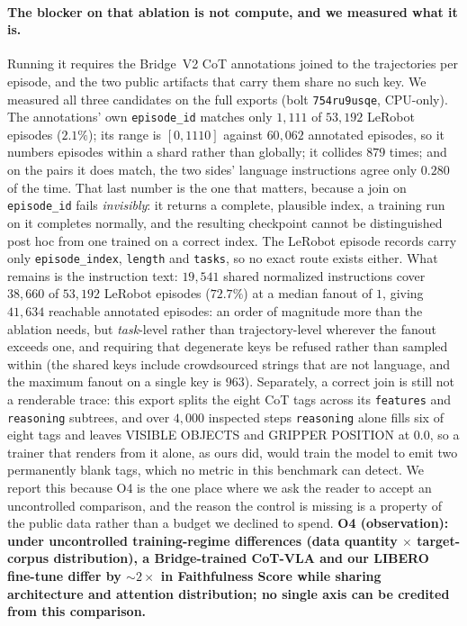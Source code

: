 \documentclass{article}
\begin{document}
\paragraph{The blocker on that ablation is not compute, and we measured what it is.}
Running it requires the Bridge~V2 CoT annotations joined to the trajectories per episode, and the two public artifacts that carry them share no such key. We measured all three candidates on the full exports (bolt \texttt{754ru9usqe}, CPU-only). The annotations' own \texttt{episode\_id} matches only $1{,}111$ of $53{,}192$ LeRobot episodes ($2.1\%$); its range is $[0,1110]$ against $60{,}062$ annotated episodes, so it numbers episodes within a shard rather than globally; it collides $879$ times; and on the pairs it does match, the two sides' language instructions agree only $0.280$ of the time. That last number is the one that matters, because a join on \texttt{episode\_id} fails \emph{invisibly}: it returns a complete, plausible index, a training run on it completes normally, and the resulting checkpoint cannot be distinguished post hoc from one trained on a correct index. The LeRobot episode records carry only \texttt{episode\_index}, \texttt{length} and \texttt{tasks}, so no exact route exists either. What remains is the instruction text: $19{,}541$ shared normalized instructions cover $38{,}660$ of $53{,}192$ LeRobot episodes ($72.7\%$) at a median fanout of $1$, giving $41{,}634$ reachable annotated episodes: an order of magnitude more than the ablation needs, but \emph{task}-level rather than trajectory-level wherever the fanout exceeds one, and requiring that degenerate keys be refused rather than sampled within (the shared keys include crowdsourced strings that are not language, and the maximum fanout on a single key is $963$). Separately, a correct join is still not a renderable trace: this export splits the eight CoT tags across its \texttt{features} and \texttt{reasoning} subtrees, and over $4{,}000$ inspected steps \texttt{reasoning} alone fills six of eight tags and leaves VISIBLE OBJECTS and GRIPPER POSITION at $0.0$, so a trainer that renders from it alone, as ours did, would train the model to emit two permanently blank tags, which no metric in this benchmark can detect. We report this because O4 is the one place where we ask the reader to accept an uncontrolled comparison, and the reason the control is missing is a property of the public data rather than a budget we declined to spend. \textbf{O4 (observation): under uncontrolled training-regime differences (data quantity $\times$ target-corpus distribution), a Bridge-trained CoT-VLA and our LIBERO fine-tune differ by $\sim 2\times$ in Faithfulness Score while sharing architecture and attention distribution; no single axis can be credited from this comparison.}
\end{document}
